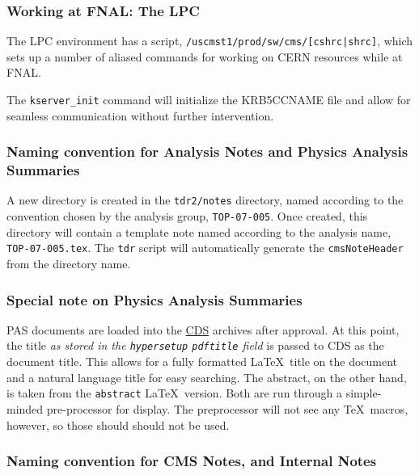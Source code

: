 \subsubsection{Working at FNAL: The LPC}
The LPC environment has a script, \texttt{/uscmst1/prod/sw/cms/[cshrc|shrc]}, which sets up a number of aliased commands for working on CERN resources while at FNAL. 

The \texttt{kserver\_init} command will initialize the KRB5CCNAME file and allow for seamless communication without further intervention.
\subsubsection{Naming convention for Analysis Notes and Physics Analysis Summaries}

A new directory is created in the \texttt{tdr2/notes} directory, named according
to the convention chosen by the analysis group, \eg \texttt{TOP-07-005}.
Once created, this directory will contain a template note named according to
the analysis name, \eg \texttt{TOP-07-005.tex}. The \texttt{tdr} script will automatically
generate the \texttt{cmsNoteHeader} from the directory name.

\subsubsection{Special note on Physics Analysis Summaries}
PAS documents are loaded into the \href{http://cdsweb.cern.ch/collection/CMS\%20PHYSICS\%20ANALYSIS\%20SUMMARIES}{CDS} archives after approval. At this point, the title \emph{as stored in the \texttt{hypersetup} \texttt{pdftitle}
field} is passed to CDS as the document title. This allows for a fully formatted \LaTeX\ title on the document and a natural language title for easy searching. The abstract, on the other hand, is taken from the \texttt{abstract} \LaTeX\ version. Both are run through a simple-minded pre-processor for display. The preprocessor will not see any \TeX\ macros, however, so those should should not be used.

\subsubsection{Naming convention for CMS Notes, and Internal Notes}

